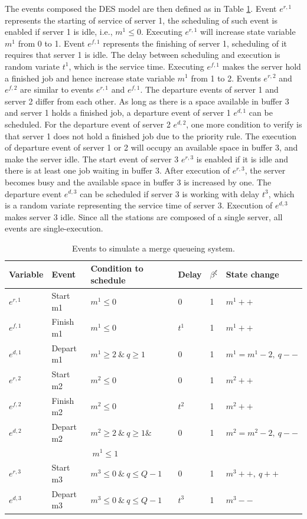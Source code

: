 \documentclass[]{interact}
\theoremstyle{plain}%
\theoremstyle{definition}
\theoremstyle{remark}
\begin{document}
The events composed the DES model are then defined as in Table \ref{tab:merge}. Event $e^{r,1}$ represents the starting of service of server 1, the scheduling of such event is enabled if server 1 is idle, i.e., $m^1\le 0$. Executing $e^{r,1}$ will increase state variable $m^1$ from 0 to 1. Event $e^{f,1}$ represents the finishing of server 1, scheduling of it requires that server 1 is idle. The delay between scheduling and execution is random variate $t^1$, which is the service time. Executing $e^{f,1}$ makes the server hold a finished job and hence increase state variable $m^1$ from 1 to 2. Events $e^{r,2}$ and $e^{f,2}$ are similar to events $e^{r,1}$ and $e^{f,1}$. The departure events of server 1 and server 2 differ from each other. As long as there is a space available in buffer 3 and server 1 holds a finished job, a departure event of server 1 $e^{d,1}$ can be scheduled. For the departure event of server 2 $e^{d,2}$, one more condition to verify is that server 1 does not hold a finished job due to the priority rule. The execution of departure event of server 1 or 2 will occupy an available space in buffer 3, and make the server idle. The start event of server 3 $e^{r,3}$ is enabled if it is idle and there is at least one job waiting in buffer 3. After execution of $e^{r,3}$, the server becomes busy and the available space in buffer 3 is increased by one. The departure event $e^{d,3}$ can be scheduled if server 3 is working with delay $t^3$, which is a random variate representing the service time of server 3. Execution of  $e^{d,3}$ makes server 3 idle. Since all the stations are composed of a single server, all events are single-execution. 

\begin{table}[h]
	\begin{tabular}{|llllll|}\hline
		Variable&Event & Condition to schedule & Delay&$\beta^{\xi}$& State change\\\hline
		$e^{r,1}$&Start m1 	& $m^1\le 0$ & $0$&1& $m^1++$ \\\hline
		$e^{f,1}$&Finish m1 & $m^1\le 0$ 	& $t^1$ &1& $m^1++$\\\hline
		$e^{d,1}$&Depart m1& $m^1\ge2\ \&\  q\ge 1$&$0$ &1 & $m^1 = m^1-2,\ q--$\\\hline
		$e^{r,2}$&Start m2 	& $m^2\le 0$ & $0$ &1& $m^2++$ \\	\hline
		$e^{f,2}$&Finish m2 & $m^2\le 0$ 	& $t^2$ &1 & $m^2++$\\\hline
		$e^{d,2}$&Depart m2& $m^2\ge2\ \&\ q\ge 1\&$&$0$  &1& $m^2=m^2-2,\ q--$\\
		&&$\ m^1\le 1 $ & &&\\\hline
		$e^{r,3}$& Start m3 & $m^3 \le 0\ \&\ q\le Q-1$&$0$  &1& $m^3++,\ q++$\\\hline
		$e^{d,3}$& Depart m3 & $m^3 \le 0\ \&\ q\le Q-1$ & $t^3$  &1& $m^3--$\\\hline
	\end{tabular}
	\caption{Events to simulate a merge queueing system.}
	\label{tab:merge}
\end{table}
\end{document}
